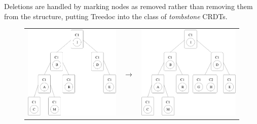 \documentclass[12pt,a4paper,twoside,openright]{report}
\begin{document}
Deletions are handled by marking nodes as removed rather than removing them from the structure, putting Treedoc into the class of \textit{tombstone} CRDTs.

\begin{figure}[htb]
\centering
  \begin{tabular}{ >{\centering}m{6cm} >{\centering}m{15mm} >{\centering\arraybackslash}m{6cm} }
    \includegraphics[width=1\linewidth]{figs/treedoc_1.eps}  &
    $\longrightarrow$  &
    \includegraphics[width=1\linewidth]{figs/treedoc_2.eps}

\end{tabular}
\end{figure}
\end{document}
